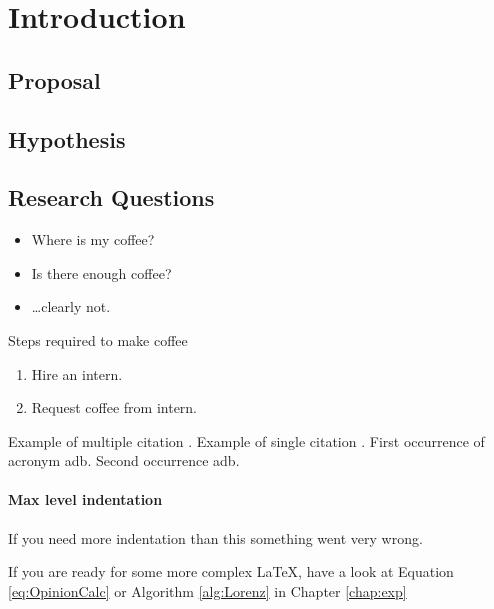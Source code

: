 
\chapter{Introduction}
\label{chap:intro}

\section{Proposal}
\label{sec:proposal}

\section{Hypothesis}
\label{sec:hype}


\section{Research Questions}
\label{sec:researchQuestions}


\begin{itemize}
    \item Where is my coffee?
    \item Is there enough coffee?
    \item \ldots clearly not.
\end{itemize}

Steps required to make coffee

\begin{enumerate}
    \item Hire an intern.
    \item Request coffee from intern.
\end{enumerate}


Example of multiple citation \citet{schneier2015,doctorow2011}. Example of single citation \cite{doctorow2011}. First occurrence of acronym \gls{adb}. Second occurrence \gls{adb}.

\subsubsection{Max level indentation}
If you need more indentation than this something went very wrong.

If you are ready for some more complex \LaTeX, have a look at Equation \ref{eq:OpinionCalc} or Algorithm \ref{alg:Lorenz} in Chapter \ref{chap:exp}
